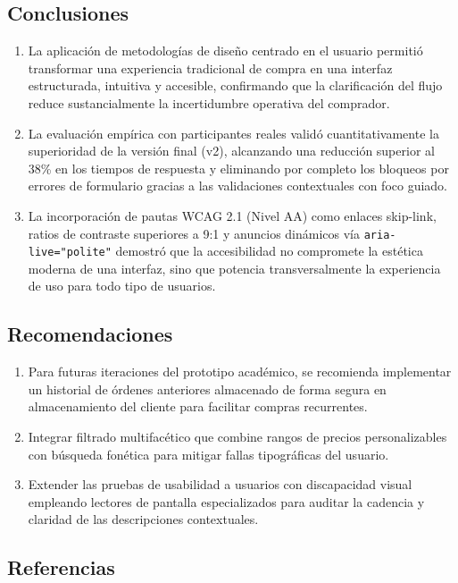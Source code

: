 \documentclass{article}
\begin{document}
\subsection{Conclusiones}
\begin{enumerate}
    \item La aplicación de metodologías de diseño centrado en el usuario permitió transformar una experiencia tradicional de compra en una interfaz estructurada, intuitiva y accesible, confirmando que la clarificación del flujo reduce sustancialmente la incertidumbre operativa del comprador.
    \item La evaluación empírica con participantes reales validó cuantitativamente la superioridad de la versión final (v2), alcanzando una reducción superior al 38\% en los tiempos de respuesta y eliminando por completo los bloqueos por errores de formulario gracias a las validaciones contextuales con foco guiado.
    \item La incorporación de pautas WCAG 2.1 (Nivel AA) como enlaces skip-link, ratios de contraste superiores a 9:1 y anuncios dinámicos vía \texttt{aria-live="polite"} demostró que la accesibilidad no compromete la estética moderna de una interfaz, sino que potencia transversalmente la experiencia de uso para todo tipo de usuarios.
\end{enumerate}

\subsection{Recomendaciones}
\begin{enumerate}
    \item Para futuras iteraciones del prototipo académico, se recomienda implementar un historial de órdenes anteriores almacenado de forma segura en almacenamiento del cliente para facilitar compras recurrentes.
    \item Integrar filtrado multifacético que combine rangos de precios personalizables con búsqueda fonética para mitigar fallas tipográficas del usuario.
    \item Extender las pruebas de usabilidad a usuarios con discapacidad visual empleando lectores de pantalla especializados para auditar la cadencia y claridad de las descripciones contextuales.
\end{enumerate}

\subsection{Referencias}
\vspace{-3em}
\renewcommand{\refname}{}



\nocite{nielsen1994heuristics}
\nocite{w3c2023wcag}
\nocite{juano2026hci}
\nocite{davidpe2026grupo2}
\nocite{mauri2026grupo3}
\end{document}
